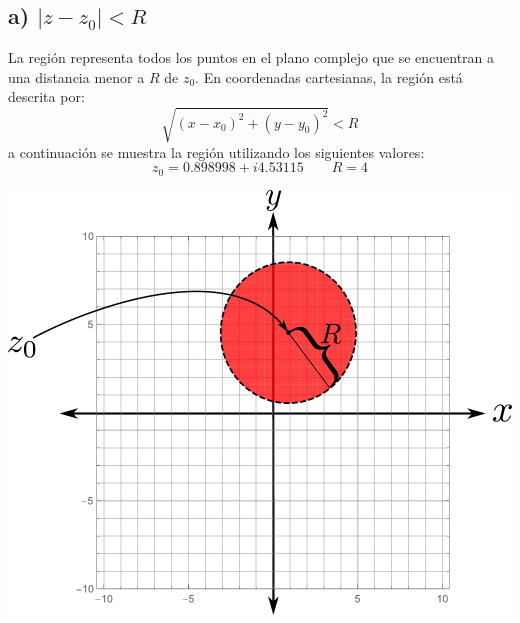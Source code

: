 \documentclass{article}
\begin{document}
\subsection*{a) $|z-z_0|<R$}
La región representa todos los puntos en el plano complejo que se encuentran a una distancia menor a $R$ de $z_0$. En coordenadas cartesianas, la región está descrita por:
$$\sqrt{(x-x_0)^2 +(y-y_0)^2}<R $$
a continuación se muestra la región utilizando los siguientes valores:
$$z_0= 0.898998 + i 4.53115 \qquad R=4$$
\begin{center}
\includegraphics[scale=0.5]{fig2.pdf}
\end{center}
\end{document}
